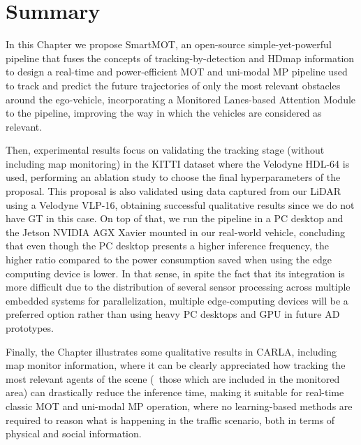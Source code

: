 \section{Summary}
\label{sec:4_summary}

In this Chapter we propose SmartMOT, an open-source simple-yet-powerful pipeline that fuses the concepts of tracking-by-detection and \ac{HDmap} information to design a real-time and power-efficient \ac{MOT} and uni-modal \ac{MP} pipeline used to track and predict the future trajectories of only the most relevant obstacles around the ego-vehicle, incorporating a Monitored Lanes-based Attention Module to the pipeline, improving the way in which the vehicles are considered as relevant.

Then, experimental results focus on validating the tracking stage (without including map monitoring) in the KITTI dataset where the Velodyne HDL-64 is used, performing an ablation study to choose the final hyperparameters of the proposal. This proposal is also validated using data captured from our \ac{LiDAR} using a Velodyne VLP-16, obtaining successful qualitative results since we do not have \ac{GT} in this case. On top of that, we run the pipeline in a PC desktop and the Jetson NVIDIA AGX Xavier mounted in our real-world vehicle, concluding that even though the PC desktop presents a higher inference frequency, the higher ratio compared to the power consumption saved when using the edge computing device is lower. In that sense, in spite the fact that its integration is more difficult due to the distribution of several sensor processing across multiple embedded systems for parallelization, multiple edge-computing devices will be a preferred option rather than using heavy PC desktops and \ac{GPU} in future \ac{AD} prototypes. 

Finally, the Chapter illustrates some qualitative results in \ac{CARLA}, including map monitor information, where it can be clearly appreciated how tracking the most relevant agents of the scene (\ie \ those which are included in the monitored area) can drastically reduce the inference time, making it suitable for real-time classic \ac{MOT} and uni-modal \ac{MP} operation, where no learning-based methods are required to reason what is happening in the traffic scenario, both in terms of physical and social information.

